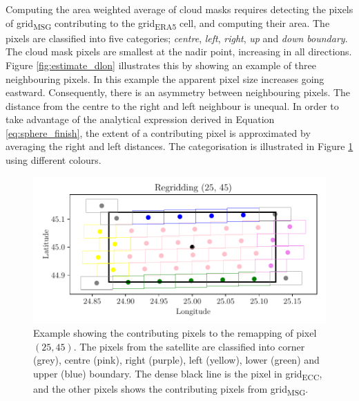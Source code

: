 Computing the area weighted average of cloud masks requires detecting the pixels of grid\textsubscript{MSG}
contributing to the grid\textsubscript{ERA5} cell, and computing their area. The pixels are classified into five categories; \textit{centre}, \textit{left}, \textit{right}, \textit{up} and \textit{down boundary}.
The cloud mask pixels are smallest at the nadir point, increasing in all directions. Figure \ref{fig:estimate_dlon} illustrates this by showing an example of three neighbouring pixels. In this example the apparent pixel size increases going eastward. Consequently, there is an asymmetry between neighbouring pixels. The distance from the centre to the right and left neighbour is unequal. In order to take advantage of the analytical expression derived in Equation \eqref{eq:sphere_finish}, the extent of a contributing pixel is approximated by averaging the right and left distances. The categorisation is illustrated in Figure \ref{fig:pixels_contributing_to_cell} using different colours.

\begin{figure}
    \centering
    \includegraphics{python_figs/example_remapping_lat45_lon25.pdf}
    \caption{Example showing the contributing pixels to the remapping of pixel $(25, 45)$. The pixels from the satellite are classified into corner (grey), centre (pink), right (purple), left (yellow), lower (green) and upper (blue) boundary. The dense black line is the pixel in grid\textsubscript{ECC}, and the other pixels shows the contributing pixels from grid\textsubscript{MSG}.}
    \label{fig:pixels_contributing_to_cell}
\end{figure}

